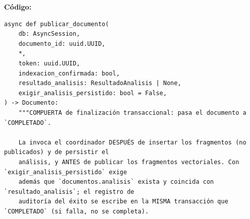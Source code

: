 \documentclass[11pt,a4paper]{article}
\begin{document}
\textbf{Código:}
\begin{lstlisting}
async def publicar_documento(
    db: AsyncSession,
    documento_id: uuid.UUID,
    *,
    token: uuid.UUID,
    indexacion_confirmada: bool,
    resultado_analisis: ResultadoAnalisis | None,
    exigir_analisis_persistido: bool = False,
) -> Documento:
    """COMPUERTA de finalización transaccional: pasa el documento a `COMPLETADO`.

    La invoca el coordinador DESPUÉS de insertar los fragmentos (no publicados) y de persistir el
    análisis, y ANTES de publicar los fragmentos vectoriales. Con `exigir_analisis_persistido` exige
    además que `documentos.analisis` exista y coincida con `resultado_analisis`; el registro de
    auditoría del éxito se escribe en la MISMA transacción que `COMPLETADO` (si falla, no se completa).


\end{lstlisting}
\end{document}
